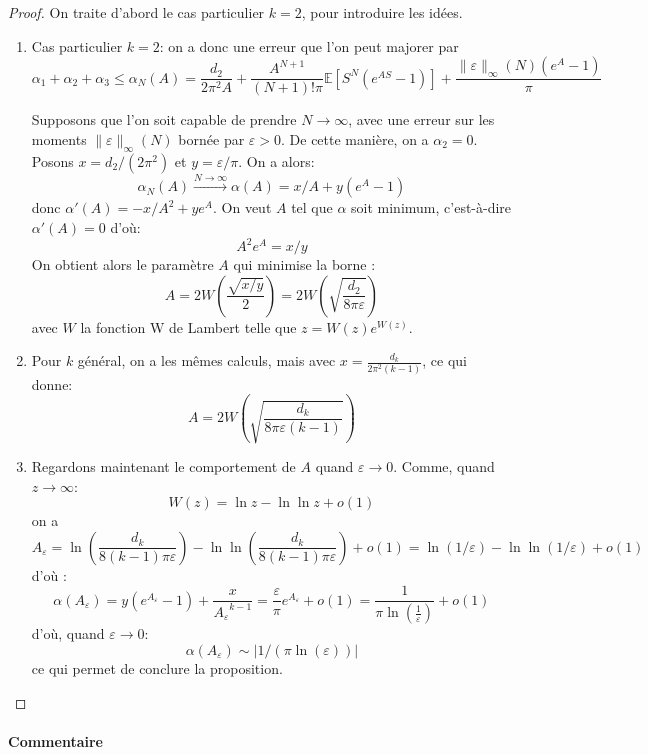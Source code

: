 \documentclass[12pt]{article}
\newcounter{prop}[section]
\newcommand{\pth}[1]{\left(#1\right)}
\newcommand{\cro}[1]{\left[#1\right]}
\newcommand{\abs}[1]{\left|#1\right|}
\newcommand{\dabs}[1]{\|#1\|}
\newcommand{\Esp}[1]{\mathbb{E}\cro{#1}}
\begin{document}
\begin{proof} On traite d'abord le cas particulier $k=2$, pour introduire les idées.
\begin{enumerate}
\item Cas particulier $k=2$: on a donc une erreur que l'on peut majorer par
\[\alpha_1+\alpha_2+\alpha_3 \leqslant \alpha_N(A)=\frac{d_2}{2\pi^2 A}+\frac{A^{N+1}}{(N+1)!\pi}\Esp{S^N(e^{AS}-1)}+\frac{\dabs{\varepsilon}_{\infty}(N)(e^A-1)}{\pi}\]

Supposons que l'on soit capable de prendre $N\to\infty$, avec une erreur sur les moments $\dabs{\varepsilon}_{\infty}(N)$ bornée par $\varepsilon>0$. De cette manière, on a $\alpha_2=0$. Posons $x=d_2/(2\pi^2)$ et $y=\varepsilon/\pi$. On a alors:
\[\alpha_N(A)\xrightarrow{N\to\infty}\alpha(A)=x/A+y(e^A-1)\]
donc $\alpha'(A)=-x/A^2+ye^A$. On veut $A$ tel que $\alpha$ soit minimum, c'est-à-dire $\alpha'(A)=0$ d'où:
\[A^2e^A=x/y\]
On obtient alors le paramètre $A$ qui minimise la borne : 
\[A = 2W\pth{\frac{\sqrt{x/y}}2} = 2W\pth{\sqrt{\frac{d_2}{8\pi \varepsilon}}}\]
avec $W$ la fonction W de Lambert telle que $z=W(z)e^{W(z)}$.

\item Pour $k$ général, on a les mêmes calculs, mais avec $x=\frac{d_k}{2\pi^2(k-1)}$, ce qui donne:
\[A=2W\pth{\sqrt{\frac{d_k}{8\pi\varepsilon (k-1)}}}\]

\item Regardons maintenant le comportement de $A$ quand $\varepsilon\to 0$. Comme, quand $z\to\infty$:
\[W(z)=\ln z-\ln\ln z+o(1)\] on a \[A_\varepsilon= \ln\pth{\frac{d_k}{8(k-1)\pi\varepsilon}}-\ln\ln\pth{\frac{d_k}{8(k-1)\pi\varepsilon}}+o(1)= \ln(1/\varepsilon)-\ln\ln(1/\varepsilon)+o(1)\] 
d'où :
\[\alpha(A_\varepsilon)=y(e^{A_\varepsilon}-1) + \frac{x}{{A_\varepsilon}^{k-1}}=\frac{\varepsilon}{\pi}e^{A_{\varepsilon}}+o(1)=\frac{1}{\pi\ln\pth{\frac{1}{\varepsilon}}}+o(1)\]
d'où, quand $\varepsilon\to 0$:
\[\alpha(A_\varepsilon)\sim \abs{1/(\pi\ln(\varepsilon))}\]
ce qui permet de conclure la proposition. 
\end{enumerate}
\end{proof}


\paragraph{Commentaire}
\end{document}
